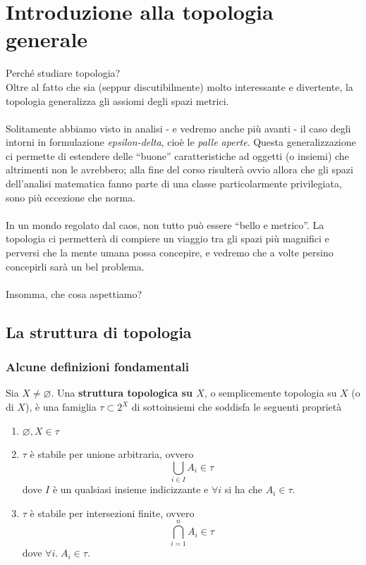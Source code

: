 \chapter{Introduzione alla topologia generale}


Perché studiare topologia? \\
Oltre al fatto che sia (seppur discutibilmente) molto interessante e divertente, la topologia generalizza gli assiomi degli spazi metrici. \\ \\ 
Solitamente abbiamo visto in analisi - e vedremo anche più avanti - il caso degli intorni in formulazione \textit{epsilon-delta}, cioè le \textit{palle aperte}. Questa generalizzazione ci permette di estendere delle \enquote{buone} caratteristiche ad oggetti (o insiemi) che altrimenti non le avrebbero; alla fine del corso risulterà ovvio allora che gli spazi dell'analisi matematica fanno parte di una classe particolarmente privilegiata, sono più eccezione che norma. \\ \\ In un mondo regolato dal caos, non tutto può essere \enquote{bello e metrico}. La topologia ci permetterà di compiere un viaggio tra gli spazi più magnifici e perversi che la mente umana possa concepire, e vedremo che a volte persino concepirli sarà un bel problema. \\ \\
Insomma, che cosa aspettiamo?



\newpage
\section{La struttura di topologia}
\subsection{\textcolor{TopGener}{\textbf{Alcune definizioni fondamentali}}}

\begin{definition}
	Sia $X \neq \varnothing$. Una \textbf{struttura topologica su $X$}, o semplicemente topologia su $X$ (o di $X$), è una famiglia $\tau\subset 2^X$ di sottoinsiemi  che soddisfa le seguenti proprietà
	\begin{enumerate}
		\item $\varnothing, X \in \tau$
		\item $\tau$ è stabile per unione arbitraria, ovvero 
		\begin{equation*}
			\bigcup_{i \in I} A_i \in \tau 	
		\end{equation*}
		dove $I$ è un qualsiasi insieme indicizzante e $\forall i$ si ha che $A_i \in \tau$.
		\item $\tau$ è stabile per intersezioni finite, ovvero 
		\begin{equation*}
			\bigcap^n_{i=1} A_i \in \tau
		\end{equation*}
		dove $\forall i. \; A_i \in \tau$.
	\end{enumerate} 
\end{definition}

